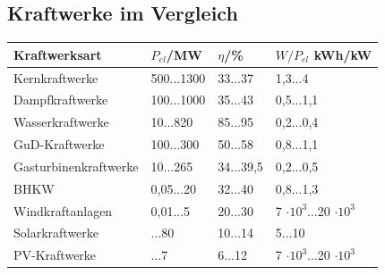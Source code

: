 \subsection{Kraftwerke im Vergleich}
\begin{tabular}{|l|l|l|l|}
\hline
Kraftwerksart & $P_{el}$/MW & $\eta$/\% & $W/P_{el}$ kWh/kW \\
\hline
Kernkraftwerke & 500...1300 & 33...37 & 1,3...4 \\
Dampfkraftwerke & 100...1000 & 35...43 & 0,5...1,1 \\
Wasserkraftwerke & 10...820 & 85...95 & 0,2...0,4 \\
GuD-Kraftwerke & 100...300 & 50...58 & 0,8...1,1 \\
Gasturbinenkraftwerke & 10...265 & 34...39,5 & 0,2...0,5 \\
BHKW & 0,05...20 & 32...40 & 0,8...1,3 \\
Windkraftanlagen & 0,01...5 & 20...30 & 7 $\cdot 10^3$...20 $\cdot 10^3$ \\
Solarkraftwerke & ...80 & 10...14 & 5...10 \\
PV-Kraftwerke & ...7 & 6...12 & 7 $\cdot 10^3$...20 $\cdot 10^3$ \\
\hline
\end{tabular}